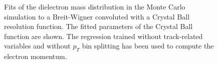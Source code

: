 \documentclass{cmspaper}
\begin{document}
\begin{figure}[h]
\centering
	\caption{Fits of the dielectron mass distribution in the Monte Carlo simulation to
        a Breit-Wigner convoluted with a Crystal Ball resolution function. The fitted parameters 
        of the Crystal Ball function are shown. The regression trained without track-related variables
        and without $p_{T}$ bin splitting has been used to compute the electron momentum.}
	\label{fig:ZMassFit_MC_Regression1}
\end{figure}
\end{document}
